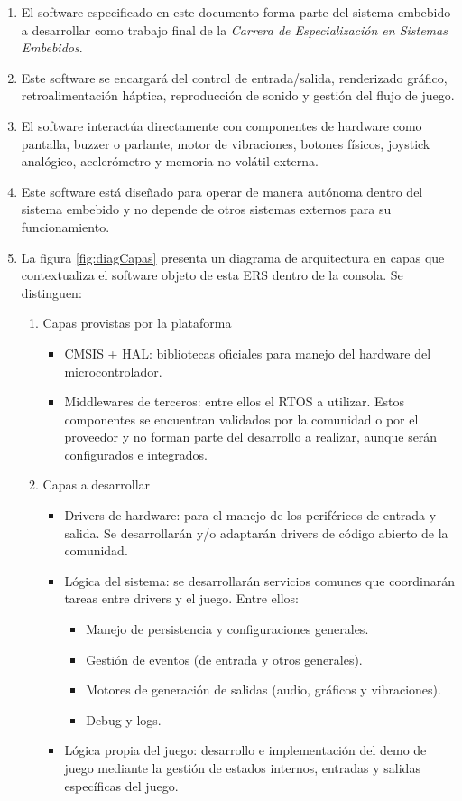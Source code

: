 \documentclass[11pt,a4paper]{article}
\begin{document}
\begin{enumerate}
  \item El software especificado en este documento forma parte del sistema embebido \textit{\ttitle} a desarrollar como trabajo final de la \textit{Carrera de Especialización en Sistemas Embebidos}. 
  \item Este software se encargará del control de entrada/salida, renderizado gráfico, retroalimentación háptica, reproducción de sonido y gestión del flujo de juego.
  \item El software interactúa directamente con componentes de hardware como pantalla, buzzer o parlante, motor de vibraciones, botones físicos, joystick analógico, acelerómetro y memoria no volátil externa.
  \item Este software está diseñado para operar de manera autónoma dentro del sistema embebido y no depende de otros sistemas externos para su funcionamiento. 
  \item La figura \ref{fig:diagCapas} presenta un diagrama de arquitectura en capas que contextualiza el software objeto de esta ERS dentro de la consola. Se distinguen:
  \begin{enumerate}
    \item Capas provistas por la plataforma
    \begin{itemize}
      \item CMSIS + HAL: bibliotecas oficiales para manejo del hardware del microcontrolador.
      \item Middlewares de terceros: entre ellos el RTOS a utilizar. Estos componentes se encuentran validados por la comunidad o por el proveedor y no forman parte del desarrollo a realizar, aunque serán configurados e integrados.
    \end{itemize}
    \item Capas a desarrollar
    \begin{itemize}
      \item Drivers de hardware: para el manejo de los periféricos de entrada y salida. Se desarrollarán y/o adaptarán drivers de código abierto de la comunidad.
      \item Lógica del sistema: se desarrollarán servicios comunes que coordinarán tareas entre drivers y el juego. Entre ellos:
      \begin{itemize}
        \item Manejo de persistencia y configuraciones generales.
        \item Gestión de eventos (de entrada y otros generales).
        \item Motores de generación de salidas (audio, gráficos y vibraciones).
        \item Debug y logs.
      \end{itemize}
      \item Lógica propia del juego: desarrollo e implementación del demo de juego mediante la gestión de estados internos, entradas y salidas específicas del juego.
    \end{itemize}
  \end{enumerate}
\end{enumerate}
\end{document}

